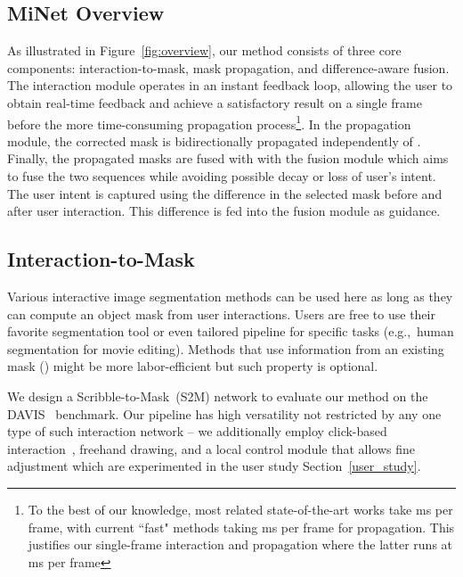 \documentclass[final]{cvpr}
\begin{document}
	\subsection{MiNet Overview}
	\vspace{-1pt}
	As illustrated in Figure~\ref{fig:overview}, our method consists of three core components: interaction-to-mask, mask propagation, and difference-aware fusion. 
	The interaction module operates in an instant feedback loop, allowing the user to obtain real-time feedback and achieve a satisfactory result on a single frame before the more time-consuming propagation process\footnote{To the best of our knowledge, most related state-of-the-art works take ms per frame, with current ``fast" methods taking ms per frame for propagation. This justifies our single-frame interaction and propagation where the latter runs at ms per frame}.
	In the propagation module, the corrected mask is bidirectionally propagated independently of . 
	Finally, the propagated masks are fused with  with the fusion module which aims to fuse the two sequences while avoiding possible decay or loss of user's intent. The user intent is captured using the difference in the selected mask before and after user interaction. This difference is fed into the fusion module as guidance.
	
	\subsection{Interaction-to-Mask}\label{i2m}
	Various interactive image segmentation methods can be used here as long as they can compute an object mask from user interactions.
	Users are free to use their favorite segmentation tool or even tailored pipeline for specific tasks (e.g.,\ human segmentation for movie editing). 
	Methods that use information from an existing mask () might be more labor-efficient but such property is optional.


	We design a Scribble-to-Mask~(S2M) network to evaluate our method on the DAVIS~\cite{Caelles_arXiv_2019} benchmark. Our pipeline has high versatility  not restricted by any one type of such interaction network -- we additionally employ click-based interaction~\cite{sofiiuk2020fbrs}, freehand drawing, and a local control module that allows fine adjustment which are experimented in the user study Section~\ref{user_study}.
	
\end{document}
